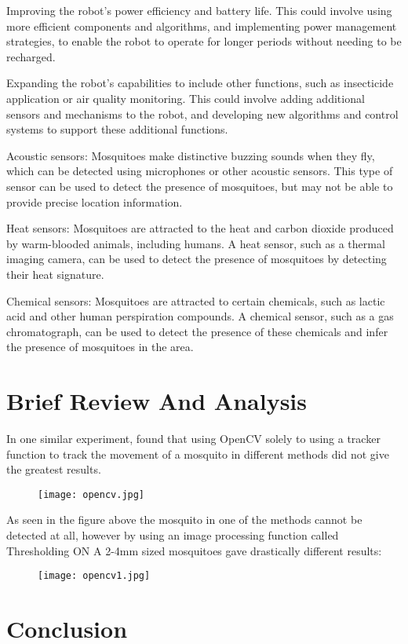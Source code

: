 \documentclass[11pt]{article}
\begin{document}
	Improving the robot's power efficiency and battery life. This could involve using more efficient components and algorithms, and implementing power management strategies, to enable the robot to operate for longer periods without needing to be recharged.
	
	Expanding the robot's capabilities to include other functions, such as insecticide application or air quality monitoring. This could involve adding additional sensors and mechanisms to the robot, and developing new algorithms and control systems to support these additional functions.
	
	
	Acoustic sensors: Mosquitoes make distinctive buzzing sounds when they fly, which can be detected using microphones or other acoustic sensors. This type of sensor can be used to detect the presence of mosquitoes, but may not be able to provide precise location information.
	
	Heat sensors: Mosquitoes are attracted to the heat and carbon dioxide produced by warm-blooded animals, including humans. A heat sensor, such as a thermal imaging camera, can be used to detect the presence of mosquitoes by detecting their heat signature.
	
	Chemical sensors: Mosquitoes are attracted to certain chemicals, such as lactic acid and other human perspiration compounds. A chemical sensor, such as a gas chromatograph, can be used to detect the presence of these chemicals and infer the presence of mosquitoes in the area.
	
	
	
	
	\section{Brief Review And Analysis}
	In one similar experiment, found that using OpenCV solely to using a tracker function to track the movement of a mosquito in different methods did not give the greatest results. 
	\begin{center}
		
		
		\begin{figure}[H]
			\centering
			\texttt{[image: opencv.jpg]}
			
			\label{fig:opencv}
		\end{figure}
	\end{center}
	As seen in the figure above the mosquito in one of the methods cannot be detected at all, however by using an image processing function called Thresholding ON A 2-4mm sized mosquitoes gave drastically different results:
	
	\begin{center}
		
		
		\begin{figure}[H]
			\centering
			\texttt{[image: opencv1.jpg]}
			
			
		\end{figure}
	\end{center}
	
	
	
	\section{Conclusion}
	
	
	
	
	
\end{document}
